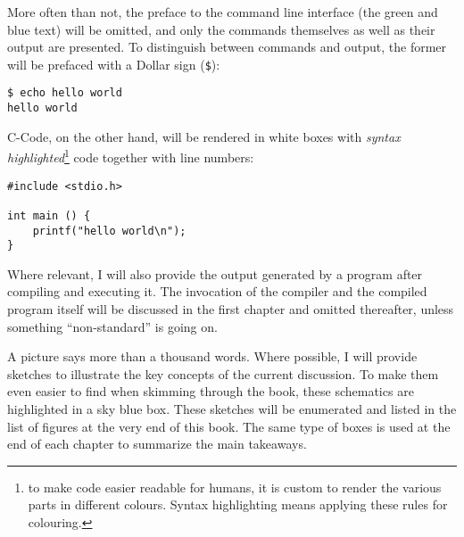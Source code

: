 More often than not, the preface to the command line interface (the green and blue text) will be omitted, and only the commands themselves as well as their output are presented. To distinguish between commands and output, the former will be prefaced with a Dollar sign (\texttt{\$}):

\begin{cmdbox}
\texttt{\$ echo hello world} \\
\texttt{hello world}
\end{cmdbox}

C-Code, on the other hand, will be rendered in white boxes with \emph{syntax highlighted}\footnote{to make code easier readable for humans, it is custom to render the various parts in different colours. Syntax highlighting means applying these rules for colouring.} code together with line numbers:
\begin{codebox}[helloworld.c]
\begin{verbatim}
#include <stdio.h>

int main () {
    printf("hello world\n");
}
\end{verbatim}
\end{codebox}

Where relevant, I will also provide the output generated by a program after compiling and executing it. The invocation of the compiler and the compiled program itself will be discussed in the first chapter and omitted thereafter, unless something \enquote{non-standard} is going on.

A picture says more than a thousand words. Where possible, I will provide sketches to illustrate the key concepts of the current discussion. To make them even easier to find when skimming through the book, these schematics are highlighted in a sky blue box. These sketches will be enumerated and listed in the list of figures at the very end of this book. The same type of boxes is used at the end of each chapter to summarize the main takeaways.

\begin{defbox}
\begin{center}
\end{center}
\end{defbox}

